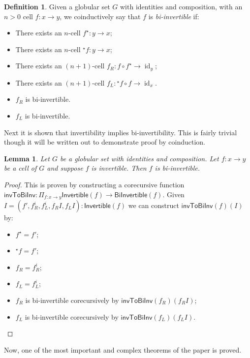 \documentclass{article}
\newtheorem{lemma}{Lemma}
\theoremstyle{definition}
\newtheorem{definition}{Definition}
\theoremstyle{examplestyle}
\DeclareMathOperator{\id}{id}
\newcommand{\linv}[1]{{}^\star\!#1}
\newcommand{\rinv}[1]{#1^\star}
\begin{document}
\begin{definition}
  Given a globular set \(G\) with identities and composition, with an \(n > 0\) cell \(f : x \to y\), we coinductively say that \(f\) is \emph{bi-invertible} if:
  \begin{itemize}
  \item There exists an \(n\)-cell \(\rinv f : y \to x\);
  \item There exists an \(n\)-cell \(\linv f : y \to x\);
  \item There exists an \((n+1)\)-cell \(f_R: f \circ \rinv f \to \id_y\);
  \item There exists an \((n+1)\)-cell \(f_L: \linv f \circ f \to \id_x\).
  \item \(f_R\) is bi-invertible.
  \item \(f_L\) is bi-invertible.
  \end{itemize}
\end{definition}

Next it is shown that invertibility implies bi-invertibility. This is fairly trivial though it will be written out to demonstrate proof by coinduction.

\begin{lemma}
  Let \(G\) be a globular set with identities and composition. Let \(f : x \to y\) be a cell of \(G\) and suppose \(f\) is invertible. Then \(f\) is bi-invertible.
\end{lemma}

\begin{proof}
  This is proven by constructing a corecursive function \(\mathsf{invToBiInv} : \Pi_{f : x \to y} \mathsf{Invertible}(f) \to \mathsf{BiInvertible}(f)\). Given \(I = (f',f_R^i,f_L^i,f_R{}I, f_L{}I) : \mathsf{Invertible}(f)\) we can construct \(\mathsf{invToBiInv}(f)(I)\) by:
  \begin{itemize}
  \item \(\rinv f = f'\);
  \item \(\linv f = f'\);
  \item \(f_R = f_R^i\);
  \item \(f_L = f_L^i\);
  \item \(f_R\) is bi-invertible corecursively by \(\mathsf{invToBiInv}(f_R)(f_R{}I)\);
  \item \(f_L\) is bi-invertible corecursively by \(\mathsf{invToBiInv}(f_L)(f_L{}I)\).
  \end{itemize}
\end{proof}

\noindent Now, one of the most important and complex theorems of the paper is proved.
\end{document}
